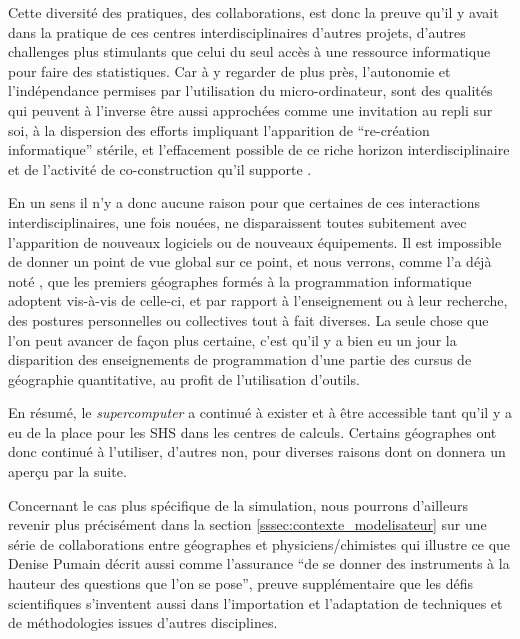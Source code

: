 Cette diversité des pratiques, des collaborations, est donc la preuve qu'il y avait dans la pratique de ces centres interdisciplinaires d'autres projets, d'autres challenges plus stimulants que celui du seul accès à une ressource informatique pour faire des statistiques. Car à y regarder de plus près, l'autonomie et l'indépendance permises par l'utilisation du micro-ordinateur, sont des qualités qui peuvent à l'inverse être aussi approchées comme une invitation au repli sur soi, à la dispersion des efforts impliquant l'apparition de \enquote{re-création informatique} stérile, et l'effacement possible de ce riche horizon interdisciplinaire et de l'activité de co-construction qu'il supporte \autocite{Banos2013}.

En un sens il n'y a donc aucune raison pour que certaines de ces interactions interdisciplinaires, une fois nouées, ne disparaissent toutes subitement avec l'apparition de nouveaux logiciels ou de nouveaux équipements. Il est impossible de donner un point de vue global sur ce point, et nous verrons, comme l'a déjà noté \autocite[372]{Cuyala2014}, que les premiers géographes formés à la programmation informatique adoptent vis-à-vis de celle-ci, et par rapport à l'enseignement ou à leur recherche, des postures personnelles ou collectives tout à fait diverses. La seule chose que l'on peut avancer de façon plus certaine, c'est qu'il y a bien eu un jour la disparition des enseignements de programmation d'une partie des cursus de géographie quantitative, au profit de l'utilisation d'outils.

En résumé, le \textit{supercomputer} a continué à exister et à être accessible tant qu'il y a eu de la place pour les SHS dans les centres de calculs. Certains géographes ont donc continué à l'utiliser, d'autres non, pour diverses raisons dont on donnera un aperçu par la suite.


Concernant le cas plus spécifique de la simulation, nous pourrons d'ailleurs revenir plus précisément dans la section \ref{sssec:contexte_modelisateur} sur une série de collaborations entre géographes et physiciens/chimistes qui illustre ce que Denise Pumain décrit aussi comme l'assurance \enquote{de se donner des instruments à la hauteur des questions que l'on se pose}, preuve supplémentaire que les défis scientifiques s'inventent aussi dans l'importation et l'adaptation de techniques et de méthodologies issues d'autres disciplines.

